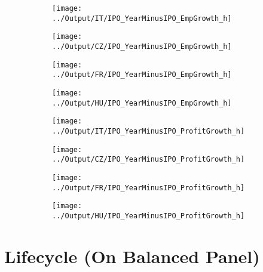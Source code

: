 \documentclass[12pt,notitlepage]{article}
\begin{document}
\begin{figure}[!htpb]
\centering
\caption{IPO and Employment growth (Haltiwanger)}
\begin{subfigure}{.49\textwidth}
    \centering
 \texttt{[image: ../Output/IT/IPO\_YearMinusIPO\_EmpGrowth\_h]}
\end{subfigure}%
\begin{subfigure}{.49\textwidth}
    \centering
 \texttt{[image: ../Output/CZ/IPO\_YearMinusIPO\_EmpGrowth\_h]}
\end{subfigure}
\begin{subfigure}{.49\textwidth}
    \centering
 \texttt{[image: ../Output/FR/IPO\_YearMinusIPO\_EmpGrowth\_h]}
\end{subfigure}%
\begin{subfigure}{.49\textwidth}
    \centering
 \texttt{[image: ../Output/HU/IPO\_YearMinusIPO\_EmpGrowth\_h]}
\end{subfigure}
\end{figure}
\pagebreak

\begin{figure}[!htpb]
\centering
\caption{IPO and Profits growth (Haltiwanger)}
\begin{subfigure}{.49\textwidth}
    \centering
 \texttt{[image: ../Output/IT/IPO\_YearMinusIPO\_ProfitGrowth\_h]}
\end{subfigure}%
\begin{subfigure}{.49\textwidth}
    \centering
 \texttt{[image: ../Output/CZ/IPO\_YearMinusIPO\_ProfitGrowth\_h]}
\end{subfigure}
\begin{subfigure}{.49\textwidth}
    \centering
 \texttt{[image: ../Output/FR/IPO\_YearMinusIPO\_ProfitGrowth\_h]}
\end{subfigure}%
\begin{subfigure}{.49\textwidth}
    \centering
 \texttt{[image: ../Output/HU/IPO\_YearMinusIPO\_ProfitGrowth\_h]}
\end{subfigure}
\end{figure}
\pagebreak


\section{Lifecycle (On Balanced Panel)} %
\label{sec:lifecycle_}
\end{document}
